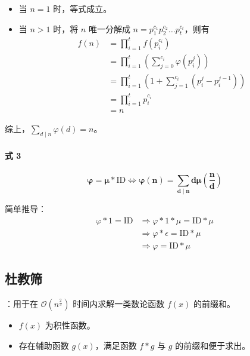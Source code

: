 \begin{itemize}
    \item 当 $n = 1$ 时，等式成立。
    \item 当 $n > 1$ 时，将 $n$ 唯一分解成 $n = p_1^{c_1}p_2^{c_2}\dots p_t^{c_t}$，则有
    \[
    \begin{aligned}
    f(n) & = \prod_{i = 1}^t f(p_i^{c_i}) \\
    & = \prod_{i = 1}^t \left( \sum_{j = 0}^{c_i} \varphi(p_i^j) \right) \\
    & = \prod_{i = 1}^t \left( 1 + \sum_{j = 1}^{c_i}(p_i^{j} - p_i^{j - 1}) \right) \\
    & = \prod_{i = 1}^t p_i^{c_i} \\
    & = n
    \end{aligned}
    \]
\end{itemize}

综上，$\sum_{d \mid n} \varphi(d) = n$。

\paragraph{式 3}
\[
\boldsymbol{\varphi = \mu \ast \mathrm{ID} \iff \varphi(n) = \sum_{d \mid n} d\mu\left( \frac{n}{d} \right)}
\]

简单推导：
\[
\begin{aligned}
\varphi \ast 1 = \mathrm{ID} & \Longrightarrow \varphi \ast 1 \ast \mu = \mathrm{ID} \ast \mu \\
& \Longrightarrow \varphi \ast \epsilon = \mathrm{ID} \ast \mu \\
& \Longrightarrow \varphi = \mathrm{ID} \ast \mu
\end{aligned}
\]

\subsection{杜教筛}

：用于在 $\mathcal{O}(n^{\frac{2}{3}})$ 时间内求解一类数论函数 $f(x)$ 的前缀和。

\begin{itemize}
    \item $f(x)$ 为积性函数。
    \item 存在辅助函数 $g(x)$，满足函数 $f \ast g$ 与 $g$ 的前缀和便于求出。
\end{itemize}

\Separator{}

